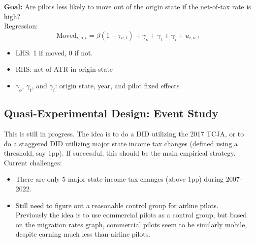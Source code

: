 \documentclass{article}
\begin{document}
\textbf{Goal:} Are pilots less likely to move out of the origin state if the net-of-tax rate is high? \\

Regression:
\begin{equation*}
	\text{Moved}_{i,o,t} =  \beta (1 - \tau_{o, t}) + \gamma_o + \gamma_t +  \gamma_i  +u_{i, o, t}
\end{equation*}
\begin{itemize}
	\item LHS: 1 if moved, 0 if not.
	\medskip
	\item RHS: net-of-ATR in origin state 
	\medskip
	\item $ \gamma_o$, $\gamma_t$, and $\gamma_i$:  origin state, year, and pilot fixed effects
\end{itemize} 




\subsection{Quasi-Experimental Design: Event Study}

This is still in progress. The idea is to do a DID utilizing the 2017 TCJA, or to do a staggered DID utilizing major state income tax changes (defined using a threshold, say 1pp). If successful, this should be the main empirical strategy.\\

\noindent
Current challenges:
\begin{itemize}
	\item There are only 5 major state income tax changes (above 1pp) during 2007-2022.
	\item Still need to figure out a reasonable control group for airline pilots. Previously the idea is to use commercial pilots as a control group, but based on the migration rates graph, commercial pilots seem to be similarly mobile, despite earning much less than airline pilots.
\end{itemize}
\end{document}
